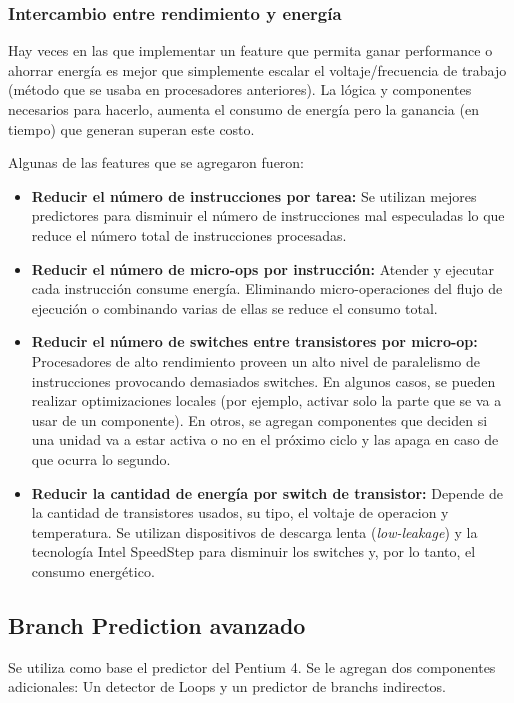 \subsubsection{Intercambio entre rendimiento y energía}
 Hay veces en las que implementar un feature que permita ganar performance o ahorrar energía es mejor que simplemente escalar el voltaje/frecuencia de trabajo (método que se usaba en procesadores anteriores). La lógica y componentes necesarios para hacerlo, aumenta el consumo de energía pero la ganancia (en tiempo) que generan superan este costo.

Algunas de las features que se agregaron fueron:
\begin{itemize}
	\item\textbf{Reducir el número de instrucciones por tarea:} Se utilizan mejores predictores para disminuir el número de instrucciones mal especuladas lo que reduce el número total de instrucciones procesadas.
	
	\item\textbf{Reducir el número de micro-ops por instrucción:} Atender y ejecutar cada instrucción consume energía. Eliminando micro-operaciones del flujo de ejecución o combinando varias de ellas se reduce el consumo total.
	
	\item\textbf{Reducir el número de switches entre transistores por micro-op:} Procesadores de alto rendimiento  proveen un alto nivel de paralelismo de instrucciones provocando demasiados switches. En algunos casos, se pueden realizar optimizaciones locales (por ejemplo, activar solo la parte que se va a usar de un componente). En otros, se agregan componentes que deciden si una unidad va a estar activa o no en el próximo ciclo y las apaga en caso de que ocurra lo segundo.
	
	\item\textbf{Reducir la cantidad de energía por switch de transistor:} Depende de la cantidad de transistores usados, su tipo, el voltaje de operacion y temperatura. Se utilizan dispositivos de descarga lenta (\textit{low-leakage}) y la tecnología Intel SpeedStep para disminuir los switches y, por lo tanto, el consumo energético. 
\end{itemize}

\subsection{Branch Prediction avanzado}

Se utiliza como base el predictor del Pentium 4. Se le agregan dos componentes adicionales: Un detector de Loops y un predictor de branchs indirectos.

